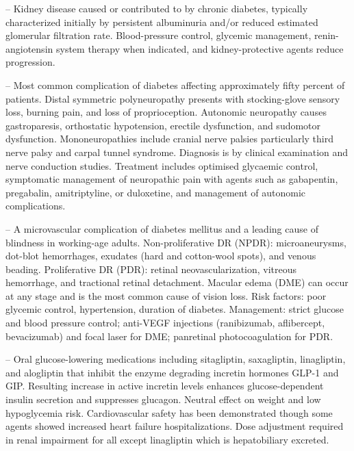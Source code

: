 -- Kidney disease caused or contributed to by chronic diabetes, typically characterized initially by persistent albuminuria and/or reduced estimated glomerular filtration rate. Blood-pressure control, glycemic management, renin-angiotensin system therapy when indicated, and kidney-protective agents reduce progression.

-- Most common complication of diabetes affecting approximately fifty percent of patients. Distal symmetric polyneuropathy presents with stocking-glove sensory loss, burning pain, and loss of proprioception. Autonomic neuropathy causes gastroparesis, orthostatic hypotension, erectile dysfunction, and sudomotor dysfunction. Mononeuropathies include cranial nerve palsies particularly third nerve palsy and carpal tunnel syndrome. Diagnosis is by clinical examination and nerve conduction studies. Treatment includes optimised glycaemic control, symptomatic management of neuropathic pain with agents such as gabapentin, pregabalin, amitriptyline, or duloxetine, and management of autonomic complications.

-- A microvascular complication of diabetes mellitus and a leading cause of blindness in working-age adults. Non-proliferative DR (NPDR): microaneurysms, dot-blot hemorrhages, exudates (hard and cotton-wool spots), and venous beading. Proliferative DR (PDR): retinal neovascularization, vitreous hemorrhage, and tractional retinal detachment. Macular edema (DME) can occur at any stage and is the most common cause of vision loss. Risk factors: poor glycemic control, hypertension, duration of diabetes. Management: strict glucose and blood pressure control; anti-VEGF injections (ranibizumab, aflibercept, bevacizumab) and focal laser for DME; panretinal photocoagulation for PDR.

-- Oral glucose-lowering medications including sitagliptin, saxagliptin, linagliptin, and alogliptin that inhibit the enzyme degrading incretin hormones GLP-1 and GIP. Resulting increase in active incretin levels enhances glucose-dependent insulin secretion and suppresses glucagon. Neutral effect on weight and low hypoglycemia risk. Cardiovascular safety has been demonstrated though some agents showed increased heart failure hospitalizations. Dose adjustment required in renal impairment for all except linagliptin which is hepatobiliary excreted.

